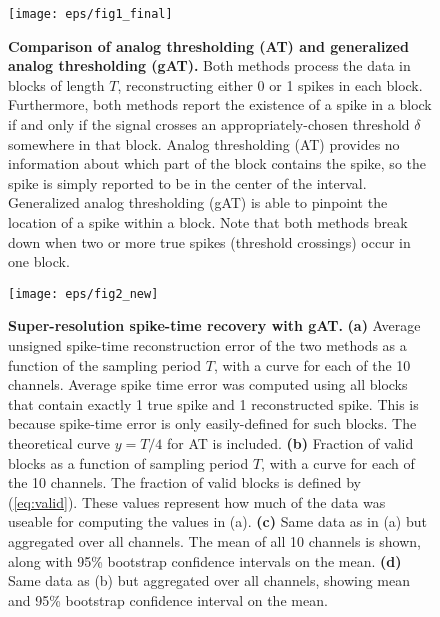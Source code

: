\documentclass[journal]{IEEEtran}
\begin{document}
\begin{figure}[!t]
\centering
\texttt{[image: eps/fig1\_final]}
\caption{{\bf Comparison of analog thresholding (AT) and generalized analog thresholding (gAT).} Both methods process the data in blocks of length $T$, reconstructing either 0 or 1 spikes in each block. Furthermore, both methods report the existence of a spike in a block if and only if the signal crosses an appropriately-chosen threshold $\delta$ somewhere in that block. Analog thresholding (AT) provides no information about which part of the block contains the spike, so the spike is simply reported to be in the center of the interval. Generalized analog thresholding (gAT) is able to pinpoint the location of a spike within a block. Note that both methods break down when two or more true spikes (threshold crossings) occur in one block.}
\label{fig:cartoon}
\end{figure}

\begin{figure}[!t]
\centering
\texttt{[image: eps/fig2\_new]}
\caption{{\bf Super-resolution spike-time recovery with gAT.} {\bf(a)} Average unsigned spike-time reconstruction error of the two methods as a function of the sampling period $T$, with a curve for each of the 10 channels. Average spike time error was computed using all blocks that contain exactly 1 true spike and 1 reconstructed spike. This is because spike-time error is only easily-defined for such blocks. The theoretical curve $y = T/4$ for AT is included. {\bf (b)} Fraction of valid blocks as a function of sampling period $T$, with a curve for each of the 10 channels. The fraction of valid blocks is defined by (\ref{eq:valid}). These values represent how much of the data was useable for computing the values in (a). {\bf (c)} Same data as in (a) but aggregated over all channels. The mean of all 10 channels is shown, along with 95\% bootstrap confidence intervals on the mean. {\bf (d)} Same data as (b) but aggregated over all channels, showing mean and 95\% bootstrap confidence interval on the mean.}
\label{fig:superres}
\end{figure}
\end{document}
